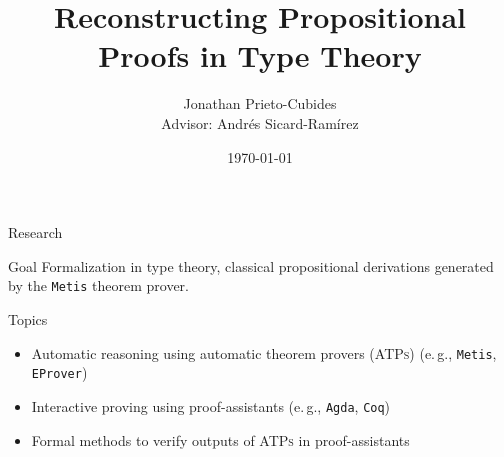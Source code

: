 \documentclass[10pt, xetex, hyperref={pdfpagelabels=false}]{beamer}
\title[Reconstructing Propositional Proofs in Type Theory]
  {\textbf{Reconstructing Propositional Proofs in Type Theory}}
\date{\today}
\author[Jonathan Prieto-Cubides]{Jonathan Prieto-Cubides\\
Advisor: Andr\'es Sicard-Ram\'irez
}
\institute{
Master in Applied Mathematics\\
Universidad EAFIT\\
Medell\'in, Colombia}
\newcommand{\abbre}[1]{\textsc{#1}\xspace}
\newcommand{\ATPs}{\abbre{ATPs}}
\newcommand{\name}[1]{\texttt{#1}\xspace}
\newcommand{\prg}[1]{\texttt{#1}\xspace}
\newcommand{\Agda}{\prg{Agda}}
\newcommand{\Metis}{\prg{Metis}}
\newcommand{\abbrev}[1]{#1} %
\newcommand{\eg}{\abbrev{e.\,g.}}
\begin{document}
\setcounter{page}{1}


\begin{frame}[plain]
\titlepage
\end{frame}


\begin{frame}{Research}

\begin{block}{Goal}
Formalization in type theory, classical propositional
derivations generated by the \Metis theorem prover.
\end{block}
\pause
\begin{block}{Topics}
\begin{itemize}
\item Automatic reasoning using automatic theorem provers (\ATPs) (\eg, \Metis, \name{EProver})
\item Interactive proving using proof-assistants (\eg, \Agda, \name{Coq})
\item Formal methods to verify outputs of \ATPs in proof-assistants
\end{itemize}
\end{block}
\end{frame}


\end{document}
